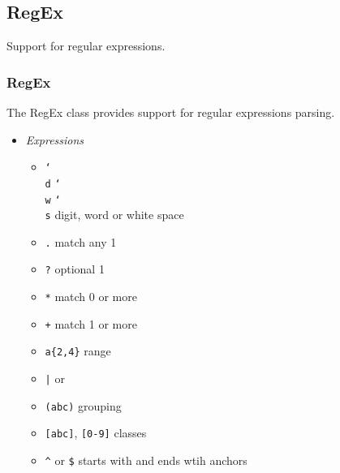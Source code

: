 \documentclass[11pt]{article}
\begin{document}
\subsection{RegEx}
Support for regular expressions.

\subsubsection{RegEx}
The RegEx class provides support for regular expressions parsing.

\begin{itemize}
\item \textit{Expressions}
  \begin{itemize}
  \item \texttt{\char`\\d} \texttt{\char`\\w} \texttt{\char`\\s}
    digit, word or white space
  \item \texttt{.} match any 1
  \item \texttt{?} optional 1
  \item \texttt{*} match 0 or more
  \item \texttt{+} match 1 or more
  \item \texttt{a\{2,4\}} range
  \item \texttt{|} or
  \item \texttt{(abc)} grouping
  \item \texttt{[abc]}, \texttt{[0-9]} classes
  \item \texttt{\^} or \texttt{\$} starts with and ends wtih anchors
  \end{itemize}
\end{itemize}
\end{document}
